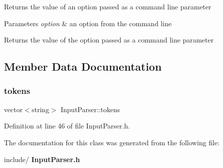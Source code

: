 Returns the value of an option passed as a command line parameter 
\begin{DoxyParams}{Parameters}
{\em option} & an option from the command line \\
\hline
\end{DoxyParams}
\begin{DoxyReturn}{Returns}
the value of the option passed as a command line parameter 
\end{DoxyReturn}


\subsection{Member Data Documentation}
\mbox{\label{class_input_parser_a4bd1105d6fc64bd0e825dc2e34515d75}} 
\subsubsection{tokens}
{\footnotesize\ttfamily vector$<$string$>$ Input\+Parser\+::tokens\hspace{0.3cm}{\ttfamily [private]}}



Definition at line 46 of file Input\+Parser.\+h.



The documentation for this class was generated from the following file\+:\begin{DoxyCompactItemize}
\item 
include/\textbf{ Input\+Parser.\+h}\end{DoxyCompactItemize}

